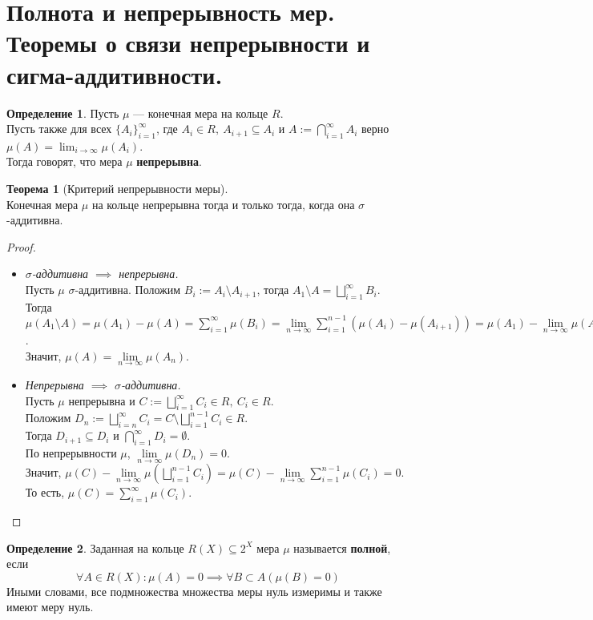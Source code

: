 \documentclass[11pt,a4paper]{report}
\theoremstyle{definition}
\theoremstyle{definition}
\newtheorem{theorem}{Теорема}[section]
\theoremstyle{definition}
\newtheorem{definition}{Определение}[section]
\begin{document}
	\section{Полнота и непрерывность мер. Теоремы о связи непрерывности и сигма-аддитивности.}
	\begin{definition}
		Пусть $ \mu $ — конечная мера на кольце $ R $.\\ 
		Пусть также для всех $ \{A_{i}\}_{i=1}^{\infty} $, где $ A_{i} \in R,\ A_{i+1} \subseteq A_{i} $ и $ A := \bigcap_{i=1}^{\infty}{A_{i}} $ верно $ \mu(A) = \lim_{i\to\infty}{\mu(A_{i})} $.\\
		Тогда говорят, что мера $ \mu $ \textbf{непрерывна}.
	\end{definition}
	\begin{theorem}[Критерий непрерывности меры]$  $\\
		Конечная мера $ \mu $ на кольце непрерывна тогда и только тогда, когда она $ \sigma $-аддитивна.
	\end{theorem}
	\begin{proof}$  $
		\begin{itemize}
			\item \textit{$ \sigma $-аддитивна $ \implies $ непрерывна.\\}
			Пусть $ \mu $ $ \sigma $-аддитивна. Положим $ B_{i} := A_{i} \setminus A_{i+1} $, тогда $ A_{1} \setminus A = \bigsqcup\limits_{i=1}^{\infty}{B_{i}} $.\\
			Тогда $ \mu(A_{1} \setminus A) = \mu(A_{1}) - \mu(A) = \sum\limits_{i=1}^{\infty}{\mu(B_{i})} = \lim\limits_{n\to\infty}{\sum\limits_{i=1}^{n-1}{(\mu(A_{i}) - \mu(A_{i+1}))}} = \mu(A_{1}) - \lim\limits_{n\to\infty}{\mu(A_{n})} $.\\
			Значит, $ \mu(A) = \lim\limits_{n\to\infty}{\mu(A_{n})} $. 
			\item \textit{Непрерывна $ \implies $ $ \sigma $-аддитивна.}\\ 
			Пусть $ \mu $ непрерывна и $ C := \bigsqcup\limits_{i=1}^{\infty}{C_{i}} \in R,\ C_{i} \in R $.\\ 
			Положим $ D_{n} := \bigsqcup\limits_{i=n}^{\infty}{C_{i}} = C \setminus \bigsqcup\limits_{i=1}^{n-1}{C_{i}} \in R $.\\
			Тогда $ D_{i+1} \subseteq D_{i} $ и $ \bigcap\limits_{i=1}^{\infty}{D_{i}} = \emptyset $.\\ 
			По непрерывности $ \mu $, $ \lim\limits_{n\to\infty}{\mu(D_{n})} = 0 $.\\
			Значит, $ \mu(C) - \lim\limits_{n\to\infty}{\mu\left (\bigsqcup\limits_{i=1}^{n-1}{C_{i}}\right )} = \mu(C) - \lim\limits_{n\to\infty}{\sum\limits_{i=1}^{n-1}{\mu(C_{i})}} = 0 $.\\
			То есть, $ \mu(C) = \sum\limits_{i=1}^{\infty}{\mu(C_{i})} $.
		\end{itemize}
	\end{proof}
	\begin{definition}
		Заданная на кольце $ R(X) \subseteq 2^{X} $ мера $ \mu $ называется \textbf{полной}, если \[ \forall A \in R(X): \mu(A) = 0 \implies \forall B \subset A (\mu(B) = 0) \]
		Иными словами, все подмножества множества меры нуль измеримы и также имеют меру нуль.
	\end{definition}
\end{document}
